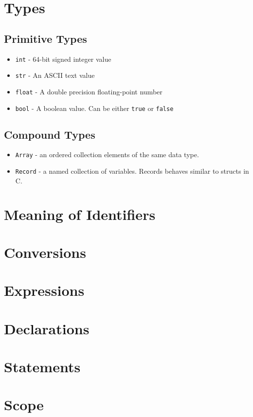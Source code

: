\documentclass{article}
\begin{document}
\section{Types}
\subsection{Primitive Types}
\label{sec:prims}
\begin{itemize}
\item \texttt{int} - 64-bit signed integer value

\item \texttt{str} - An ASCII text value

\item \texttt{float} - A double precision floating-point number

\item \texttt{bool} - A boolean value. Can be either \texttt{true} or \texttt{false}

\end{itemize}

\subsection{Compound Types}

\begin{itemize} 

\item \texttt{Array} - an ordered collection elements of the same data type.
\item \texttt{Record} - a named collection of variables. Records behaves similar to structs in C.

\end{itemize}

\section{Meaning of Identifiers}

\section{Conversions}

\section{Expressions}

\section{Declarations}


\section{Statements}

\section{Scope}
\end{document}
